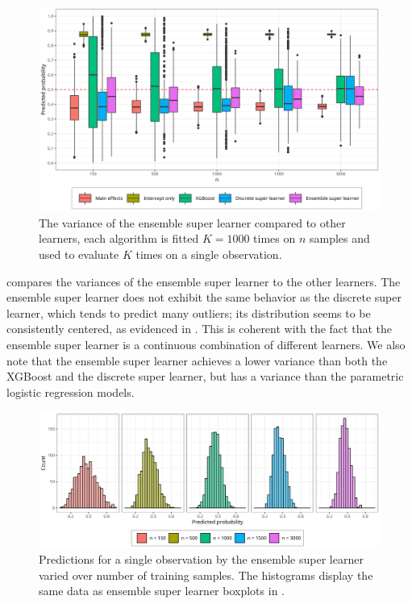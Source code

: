 \documentclass[./main.tex]{subfiles}
\begin{document}
\begin{figure}[H]
    \centering
    \includegraphics[width=\textwidth]{figures/learner_vars_w_esl_1000.png}
    \caption{The variance of the ensemble super learner compared to other learners, each algorithm is fitted $ K = 1000 $ times on $n$ samples and used to evaluate $ K $ times on a single observation.}
    \label{fig:learner_vars_w_esl_1000}
\end{figure}
 compares the variances of the ensemble super learner to the other learners. The ensemble super learner does not exhibit the same behavior as the discrete super learner, which tends to predict many outliers; its distribution seems to be consistently centered, as evidenced in . This is coherent with the fact that the ensemble super learner is a continuous combination of different learners. We also note that the ensemble super learner achieves a lower variance than both the XGBoost and the discrete super learner, but has a variance than the parametric logistic regression models. 
\begin{figure}[H]
    \centering
    \includegraphics[width=\textwidth]{figures/hist_esl_dist.png}
    \caption{Predictions for a single observation by the ensemble super learner varied over number of training samples. The histograms display the same data as ensemble super learner boxplots in .}
    \label{fig:hist_esl_dist}
\end{figure}
\end{document}
